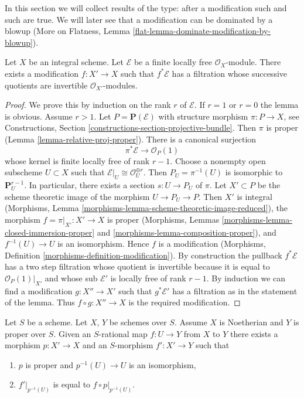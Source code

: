 \noindent
In this section we will collect results of the type: after a modification
such and such are true. We will later see that a modification can be
dominated by a blowup (More on Flatness, Lemma
\ref{flat-lemma-dominate-modification-by-blowup}).

\begin{lemma}
\label{lemma-filter-after-modification}
Let $X$ be an integral scheme. Let $\mathcal{E}$ be a finite locally free
$\mathcal{O}_X$-module. There exists a modification $f : X' \to X$
such that $f^*\mathcal{E}$ has a filtration whose successive quotients
are invertible $\mathcal{O}_{X'}$-modules.
\end{lemma}

\begin{proof}
We prove this by induction on the rank $r$ of $\mathcal{E}$.
If $r = 1$ or $r = 0$ the lemma is obvious. Assume $r > 1$.
Let $P = \mathbf{P}(\mathcal{E})$ with structure morphism $\pi : P \to X$,
see Constructions, Section \ref{constructions-section-projective-bundle}.
Then $\pi$ is proper (Lemma \ref{lemma-relative-proj-proper}).
There is a canonical surjection
$$
\pi^*\mathcal{E} \to \mathcal{O}_P(1)
$$
whose kernel is finite locally free of rank $r - 1$.
Choose a nonempty open subscheme $U \subset X$ such that
$\mathcal{E}|_U \cong \mathcal{O}_U^{\oplus r}$.
Then $P_U = \pi^{-1}(U)$ is isomorphic to $\mathbf{P}^{r - 1}_U$.
In particular, there exists a section $s : U \to P_U$ of $\pi$.
Let $X' \subset P$ be the scheme theoretic image of the
morphism $U \to P_U \to P$. Then $X'$ is integral
(Morphisms, Lemma \ref{morphisms-lemma-scheme-theoretic-image-reduced}),
the morphism $f = \pi|_{X'} : X' \to X$ is proper (Morphisms, Lemmas
\ref{morphisms-lemma-closed-immersion-proper} and
\ref{morphisms-lemma-composition-proper}), and
$f^{-1}(U) \to U$ is an isomorphism. Hence $f$ is a modification
(Morphisms, Definition \ref{morphisms-definition-modification}).
By construction the pullback $f^*\mathcal{E}$ has a two step
filtration whose quotient is invertible because it is equal to
$\mathcal{O}_P(1)|_{X'}$ and whose sub $\mathcal{E}'$ is locally free of rank
$r - 1$. By induction we can find a modification $g : X'' \to X'$
such that $g^*\mathcal{E}'$ has a filtration as in the statement of
the lemma. Thus $f \circ g : X'' \to X$ is the required modification.
\end{proof}

\begin{lemma}
\label{lemma-extend-rational-map-after-modification}
Let $S$ be a scheme. Let $X$, $Y$ be schemes over $S$.
Assume $X$ is Noetherian and $Y$ is proper over $S$.
Given an $S$-rational map $f : U \to Y$ from $X$ to $Y$
there exists a morphism $p : X' \to X$ and an
$S$-morphism $f' : X' \to Y$ such that
\begin{enumerate}
\item $p$ is proper and $p^{-1}(U) \to U$ is an isomorphism,
\item $f'|_{p^{-1}(U)}$ is equal to $f \circ p|_{p^{-1}(U)}$.
\end{enumerate}
\end{lemma}

